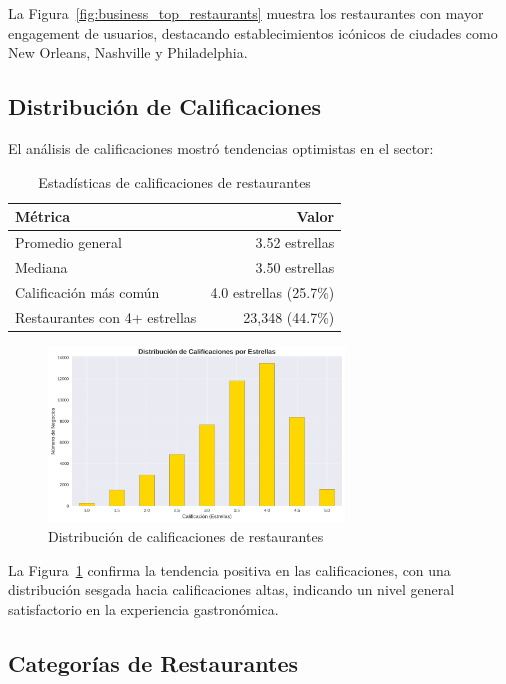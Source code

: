\documentclass[12pt,a4paper,twoside,openany]{book}
\begin{document}
La Figura~\ref{fig:business_top_restaurants} muestra los restaurantes con mayor engagement de usuarios, destacando establecimientos icónicos de ciudades como New Orleans, Nashville y Philadelphia.

\subsection{Distribución de Calificaciones}

El análisis de calificaciones mostró tendencias optimistas en el sector:

\begin{table}[H]
\centering
\caption{Estadísticas de calificaciones de restaurantes}
\begin{tabular}{@{}lr@{}}
\toprule
\textbf{Métrica} & \textbf{Valor} \\
\midrule
Promedio general & 3.52 estrellas \\
Mediana & 3.50 estrellas \\
Calificación más común & 4.0 estrellas (25.7\%) \\
Restaurantes con 4+ estrellas & 23,348 (44.7\%) \\
\bottomrule
\end{tabular}
\end{table}

\begin{figure}[H]
\centering
\includegraphics[width=0.7\textwidth]{figures/business_ratings_distribution.png}
\caption{Distribución de calificaciones de restaurantes}
\label{fig:business_ratings_distribution}
\end{figure}

La Figura~\ref{fig:business_ratings_distribution} confirma la tendencia positiva en las calificaciones, con una distribución sesgada hacia calificaciones altas, indicando un nivel general satisfactorio en la experiencia gastronómica.

\subsection{Categorías de Restaurantes}
\end{document}
